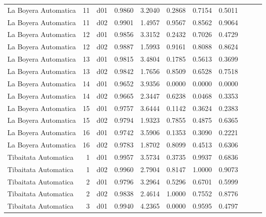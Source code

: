 \begin{landscape}
\begin{longtable}{p{2cm}rrrrrrrrrr}
 La Boyera Automatica  &         11 &     d01 &   0.9860 &  3.2040 &        0.2868 &           0.7154 &  0.5011 \\
 La Boyera Automatica  &         11 &     d02 &   0.9901 &  1.4957 &        0.9567 &           0.8562 &  0.9064 \\
 La Boyera Automatica  &         12 &     d01 &   0.9856 &  3.3152 &        0.2432 &           0.7026 &  0.4729 \\
 La Boyera Automatica  &         12 &     d02 &   0.9887 &  1.5993 &        0.9161 &           0.8088 &  0.8624 \\
 La Boyera Automatica  &         13 &     d01 &   0.9815 &  3.4804 &        0.1785 &           0.5613 &  0.3699 \\
 La Boyera Automatica  &         13 &     d02 &   0.9842 &  1.7656 &        0.8509 &           0.6528 &  0.7518 \\
 La Boyera Automatica  &         14 &     d01 &   0.9652 &  3.9356 &        0.0000 &           0.0000 &  0.0000 \\
 La Boyera Automatica  &         14 &     d02 &   0.9665 &  2.3447 &        0.6238 &           0.0468 &  0.3353 \\
 La Boyera Automatica  &         15 &     d01 &   0.9757 &  3.6444 &        0.1142 &           0.3624 &  0.2383 \\
 La Boyera Automatica  &         15 &     d02 &   0.9794 &  1.9323 &        0.7855 &           0.4875 &  0.6365 \\
 La Boyera Automatica  &         16 &     d01 &   0.9742 &  3.5906 &        0.1353 &           0.3090 &  0.2221 \\
 La Boyera Automatica  &         16 &     d02 &   0.9783 &  1.8702 &        0.8099 &           0.4513 &  0.6306 \\
 Tibaitata Automatica  &          1 &     d01 &   0.9957 &  3.5734 &        0.3735 &           0.9937 &  0.6836 \\
 Tibaitata Automatica  &          1 &     d02 &   0.9960 &  2.7904 &        0.8147 &           1.0000 &  0.9073 \\
 Tibaitata Automatica  &          2 &     d01 &   0.9796 &  3.2964 &        0.5296 &           0.6701 &  0.5999 \\
 Tibaitata Automatica  &          2 &     d02 &   0.9838 &  2.4614 &        1.0000 &           0.7552 &  0.8776 \\
 Tibaitata Automatica  &          3 &     d01 &   0.9940 &  4.2365 &        0.0000 &           0.9595 &  0.4797 \\

\end{longtable}
\end{landscape}
